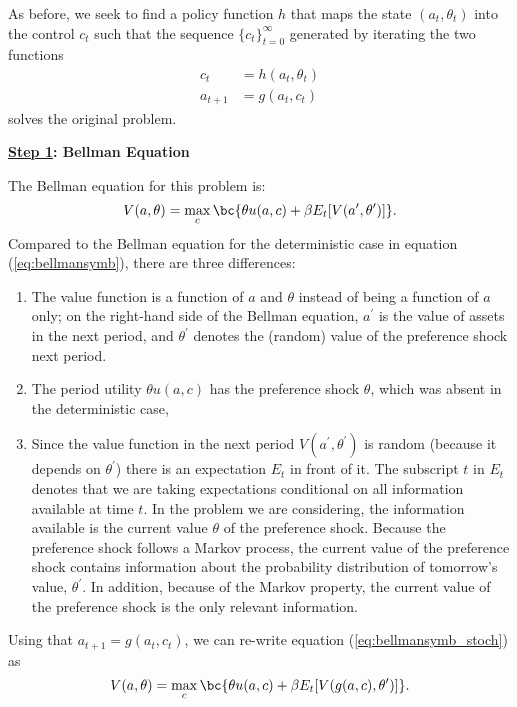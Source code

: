 \documentclass[\topdir/lecture\_notes.tex]{subfiles}
\begin{document}
As before, we seek to find a policy function $h$ that maps the state $(a_{t},\theta_t)$ into the control $c_{t}$ such that the sequence
$\{c_{t}\}_{t=0}^{\infty}$ generated by iterating the two functions
\begin{align*}
c_{t} & =h(a_{t},\theta_t) \\
a_{t+1} & =g(a_{t},c_{t})
\end{align*}
solves the original problem.

\textbf{\underline{Step 1}: Bellman Equation}

The Bellman equation for this problem is:
\begin{equation}
V(a,\theta)=\max_{c}\bc{\theta u(a,c)+\beta E_t[V(a^\prime,\theta^\prime)]}.\label{eq:bellmansymb_stoch}
\end{equation}
Compared to the Bellman equation for the deterministic case in equation (\ref{eq:bellmansymb}), there are three differences:
\begin{enumerate}
    \item The value function is a function of $a$ and $\theta$ instead of being a function of $a$ only; on the right-hand side of the Bellman equation, $a^\prime$ is the value of assets in the next period, and $\theta^\prime$ denotes the (random) value of the preference shock next period.
    \item The period utility $\theta u(a,c)$ has the preference shock $\theta$, which was absent in the deterministic case,
    \item Since the value function in the next period $V(a^\prime,\theta^\prime)$ is random (because it depends on $\theta^\prime$) there is an expectation $E_t$ in front of it. The subscript $t$ in $E_t$ denotes that we are taking expectations conditional on all information available at time $t$. In the problem we are considering, the information available is the current value $\theta$ of the preference shock. Because the preference shock follows a Markov process, the current value of the preference shock contains information about the probability distribution of tomorrow's value, $\theta^\prime$. In addition, because of the Markov property, the current value of the preference shock is the only relevant information.
\end{enumerate} 
Using that $a_{t+1} =g(a_{t},c_{t})$, we can re-write equation (\ref{eq:bellmansymb_stoch}) as
\begin{equation}
V(a,\theta)=\max_{c}\bc{\theta u(a,c)+\beta E_t[V(g(a,c),\theta^\prime)]}.\label{eq:bellmansymb_stoch_c}
\end{equation}
\end{document}
